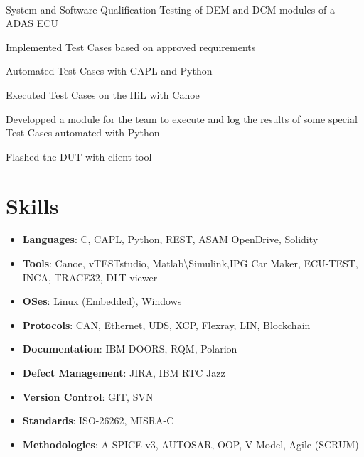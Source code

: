 \documentclass{my_cv}
\begin{document}
\\
{ }{System and Software Qualification Testing of DEM and DCM modules of a ADAS ECU}{
    \item Implemented Test Cases based on approved requirements
    \item Automated Test Cases with CAPL and Python
    \item Executed Test Cases on the HiL with Canoe
    \item Developped a module for the team to execute and log the results of some special Test Cases automated with Python
    \item Flashed the DUT with client tool


}\vspace{0.1cm}

\vspace{-12pt}

\section{Skills}
\begin{itemize}[leftmargin=10pt, itemsep=0pt]

\item {\bf Languages}: C, CAPL, Python, REST, ASAM OpenDrive, Solidity
\item {\bf Tools}: Canoe, vTESTstudio, Matlab\textbackslash Simulink,IPG Car Maker, ECU-TEST, INCA, TRACE32, DLT viewer
\item {\bf  OSes}:  Linux (Embedded), Windows
\item {\bf  Protocols}:  CAN, Ethernet, UDS, XCP, Flexray, LIN, Blockchain 
\item {\bf Documentation}:  IBM DOORS, RQM, Polarion
\item {\bf  Defect Management}: JIRA, IBM RTC Jazz
\item {\bf   Version Control}: GIT, SVN
\item {\bf Standards}:  ISO-26262, MISRA-C
\item {\bf Methodologies}:  A-SPICE v3, AUTOSAR, OOP, V-Model, Agile (SCRUM)


\end{itemize}
\end{document}
